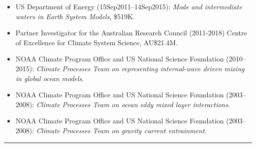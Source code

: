 \documentclass{article}
\begin{document}
\begin{itemize}[leftmargin=*]
\item US Department of Energy (15Sep2011--14Sep2015): {\it Mode and intermediate waters in Earth System Models}, \$519K.

\item Partner Investigator for the Australian Research Council (2011-2018) Centre of Excellence for Climate System Science, AU\$21.4M.
  
\item NOAA Climate Program Office and US National Science Foundation (2010--2015): {\it Climate Processes Team on representing internal-wave driven mixing in global ocean models}.

\item NOAA Climate Program Office and US National Science Foundation (2003--2008): {\it Climate Processes Team on ocean eddy mixed layer interactions}.

\item NOAA Climate Program Office and US National Science Foundation (2003--2008): {\it Climate Processes Team on gravity current entrainment}.

\end{itemize}



\noindent\rule{\textwidth}{1pt}
\vspace{-1cm}
%

\end{document}
